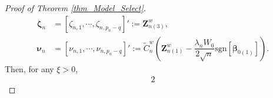 \documentclass[ejs,authoryear,linksfromyear]{imsart}
\newcommand{\sumin}{\sum_{i=1}^n} %
\newcommand{\znwa}{\bm{Z}_{n(1)}^w}
\newcommand{\znwc}{\bm{Z}_{n(3)}^w}
\numberwithin{equation}{section}
\theoremstyle{plain}
\begin{document}
\begin{proof}[Proof of Theorem \ref{thm_Model_Select}]
	\begin{align*}
	\bm{\zeta}_n 
	&= 
	\left[
		\zeta_{n,1}, \cdots, \zeta_{n,p_n-q}
	\right]' 
	:= \znwc, \\    
	\bm{\nu}_n
	&=\left[
		\nu_{n,1}, \cdots, \nu_{n,p_n-q}
	\right]' 
	:= \widetilde{C}^w_n 
	\left(
		\znwa - 
		\dfrac{\lambda_n W_0}{2 \sqrt{n}} 
		\text{sgn} \left[ \bm{\beta}_{0(1)} \right]
	\right).
	\end{align*}
	Then, for any $\xi > 0$,
		\begin{alignat*}{2}

\end{alignat*}
\end{proof}
\end{document}
